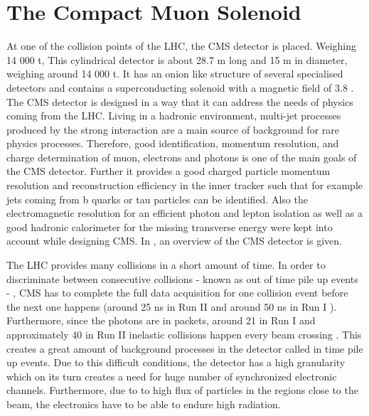 \section{The Compact Muon Solenoid}
At one of the collision points of the LHC, the CMS detector\cite{CMS, Bayatian:2006zz,Bayatian:922757} is placed. Weighing 14 000 \si{ \tonne}, This cylindrical detector is about 28.7 \si{ \meter} long and 15 \si{ \meter} in diameter, weighing around 14 000 \si{ \tonne}. It has an onion like structure of several specialised detectors and contains a superconducting solenoid with a magnetic field of 3.8 \si{ \Tesla}. The CMS detector is designed in a way that it can address the needs of physics coming from the LHC. Living in a hadronic environment, multi-jet processes produced by the strong interaction are a main source of background for rare physics processes. Therefore, good identification, momentum resolution, and charge determination of muon, electrons and photons is one of the main goals of the CMS detector. Further it provides a good charged particle momentum resolution and reconstruction efficiency in the inner tracker such that for example jets coming from b quarks or tau particles can be identified. Also the electromagnetic resolution for an efficient photon and lepton isolation as well as a good hadronic calorimeter for the missing transverse energy were kept into account while designing CMS. In , an overview of the CMS detector is given. 

The LHC provides many collisions in a short amount of time. In order to discriminate between consecutive collisions - known as out of time pile up events - , CMS has to complete the full data acquisition for one collision event before the next one happens (around 25 \si{ \nano \second} in Run II and around 50 \si{ \nano \second} in Run I \cite{OLuanaigh:2051986}). Furthermore, since the photons are in packets, around 21 in Run I and approximately 40 in Run II  inelastic collisions happen every beam crossing . This creates a great amount of background processes in the detector called in time pile up events. Due to this difficult conditions, the detector has a high granularity which on its turn creates a need for huge number of synchronized electronic channels. Furthermore, due to to high flux of particles in the regions close to the beam, the electronics have to be able to endure high radiation.


